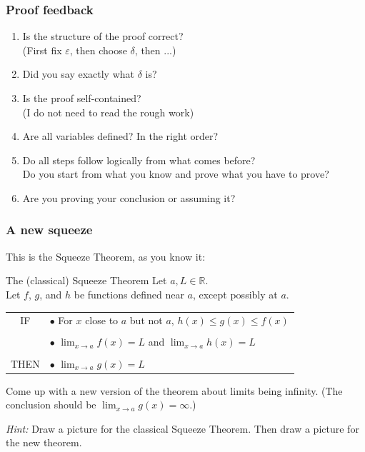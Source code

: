 \documentclass[14pt]{beamer}
\begin{document}
\begin{frame}[t]
	\frametitle{Proof feedback}

	\begin{enumerate}
		\item Is the structure of the proof correct? \\ (First fix $\varepsilon$,
			then choose $\delta$, then ...)

		\item Did you say exactly what $\delta$ is?

		\item Is the proof self-contained? \\ (I do not need to read the rough work)

		\item Are all variables defined? In the right order?

		\item Do all steps follow logically from what comes before? \\ Do you start
			from what you know and prove what you have to prove? \\

		\item Are you proving your conclusion or assuming it?
	\end{enumerate}
\end{frame}

\begin{frame}[t]
	\frametitle{A new squeeze}
	\fontsize{13}{13}\selectfont This is the Squeeze Theorem, as you know it:

	\begin{block}{The (classical) Squeeze Theorem}
		Let $a, L \in \mathbb{R}$. \\ Let $f$, $g$, and $h$ be functions defined
		near $a$, except possibly at $a$.

		\vspace{.2cm}
		\begin{tabular}{cl}
			IF             & $\bullet$ {For $x$ close to $a$ but not $a$,} \; $\displaystyle h(x) \leq g(x) \leq f(x)$              \\
			\vspace{-0.2cm} \\
			               & $\bullet$ $\displaystyle \lim_{x \to a}f(x) = L$ \quad and \quad$\displaystyle \lim_{x \to a}h(x) = L$ \\
			\vspace{-.1cm}  \\
			THEN           & $\bullet$ $\displaystyle \lim_{x \to a}g(x) = L$
		\end{tabular}
	\end{block}

	Come up with a new version of the theorem about limits being infinity. (The
	conclusion should be $\displaystyle \lim_{x \to a}g(x) = \infty$.)

	\emph{Hint:} Draw a picture for the classical Squeeze Theorem. Then draw a picture
	for the new theorem.
\end{frame}
\end{document}
